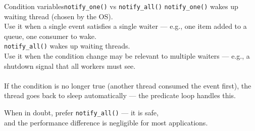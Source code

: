 \begin{frame}{Condition variables}{\texttt{notify\_one()} vs \texttt{notify\_all()}}
	\justifying
	\texttt{notify\_one()} wakes up  waiting thread (chosen by the OS).\\
	Use it when a single event satisfies a single waiter — e.g., one item added to a queue, one consumer to wake.\\
	\bigskip
	\texttt{notify\_all()} wakes up  waiting threads.\\
	Use it when the condition change may be relevant to multiple waiters — e.g., a shutdown signal that all workers must see.\\
	\bigskip
	\\
	If the condition is no longer true (another thread consumed the event first), the thread goes back to sleep automatically — the predicate loop handles this.\\
	\bigskip
	\begin{block}{}
		\centering
		When in doubt, prefer \texttt{notify\_all()} — it is safe,\\
    and the performance difference is negligible for most applications.
	\end{block}
\end{frame}
